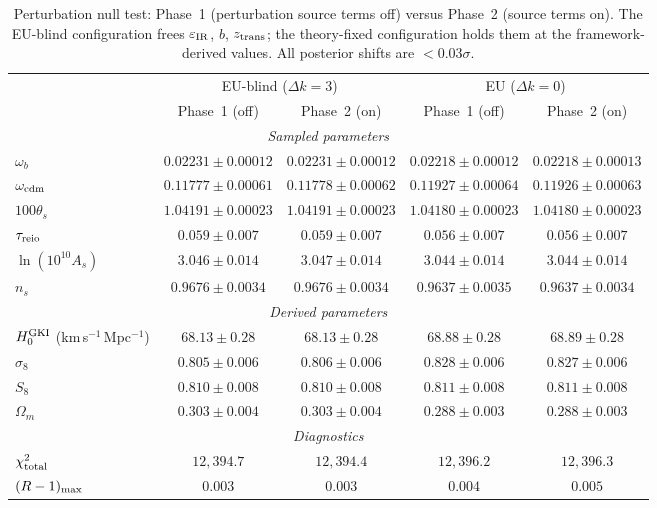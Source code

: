 \documentclass[a4paper,fleqn]{cas-dc}
\begin{document}
\begin{table}[pos=!htbp]
\caption{Perturbation null test: Phase~1 (perturbation
source terms off) versus Phase~2 (source terms on).
The EU-blind configuration frees
$\varepsilon_{\rm IR}$, $b$, $z_{\rm trans}$; the
theory-fixed configuration holds them at the
framework-derived values. All posterior shifts are
$< 0.03\sigma$.}
\label{tab:null_test}
\begin{tabular}{lcccc}
 & \multicolumn{2}{c}{EU-blind ($\Delta k{=}3$)}
 & \multicolumn{2}{c}{EU ($\Delta k{=}0$)} \\
 & Phase~1 (off) & Phase~2 (on)
 & Phase~1 (off) & Phase~2 (on) \\
\hline
\multicolumn{5}{c}{\textit{Sampled parameters}} \\
$\omega_b$
  & $0.02231 \pm 0.00012$ & $0.02231 \pm 0.00012$
  & $0.02218 \pm 0.00012$ & $0.02218 \pm 0.00013$ \\
$\omega_{\rm cdm}$
  & $0.11777 \pm 0.00061$ & $0.11778 \pm 0.00062$
  & $0.11927 \pm 0.00064$ & $0.11926 \pm 0.00063$ \\
$100\theta_s$
  & $1.04191 \pm 0.00023$ & $1.04191 \pm 0.00023$
  & $1.04180 \pm 0.00023$ & $1.04180 \pm 0.00023$ \\
$\tau_{\rm reio}$
  & $0.059 \pm 0.007$ & $0.059 \pm 0.007$
  & $0.056 \pm 0.007$ & $0.056 \pm 0.007$ \\
$\ln(10^{10}A_s)$
  & $3.046 \pm 0.014$ & $3.047 \pm 0.014$
  & $3.044 \pm 0.014$ & $3.044 \pm 0.014$ \\
$n_s$
  & $0.9676 \pm 0.0034$ & $0.9676 \pm 0.0034$
  & $0.9637 \pm 0.0035$ & $0.9637 \pm 0.0034$ \\
\hline
\multicolumn{5}{c}{\textit{Derived parameters}} \\
$H_0^{\rm GKI}$ (km\,s$^{-1}$\,Mpc$^{-1}$)
  & $68.13 \pm 0.28$ & $68.13 \pm 0.28$
  & $68.88 \pm 0.28$ & $68.89 \pm 0.28$ \\
$\sigma_8$
  & $0.805 \pm 0.006$ & $0.806 \pm 0.006$
  & $0.828 \pm 0.006$ & $0.827 \pm 0.006$ \\
$S_8$
  & $0.810 \pm 0.008$ & $0.810 \pm 0.008$
  & $0.811 \pm 0.008$ & $0.811 \pm 0.008$ \\
$\Omega_m$
  & $0.303 \pm 0.004$ & $0.303 \pm 0.004$
  & $0.288 \pm 0.003$ & $0.288 \pm 0.003$ \\
\hline
\multicolumn{5}{c}{\textit{Diagnostics}} \\
$\chi^2_{\rm total}$
  & $12{,}394.7$ & $12{,}394.4$
  & $12{,}396.2$ & $12{,}396.3$ \\
$(R-1)_{\rm max}$
  & $0.003$ & $0.003$
  & $0.004$ & $0.005$ \\
\end{tabular}
\end{table}
\end{document}
